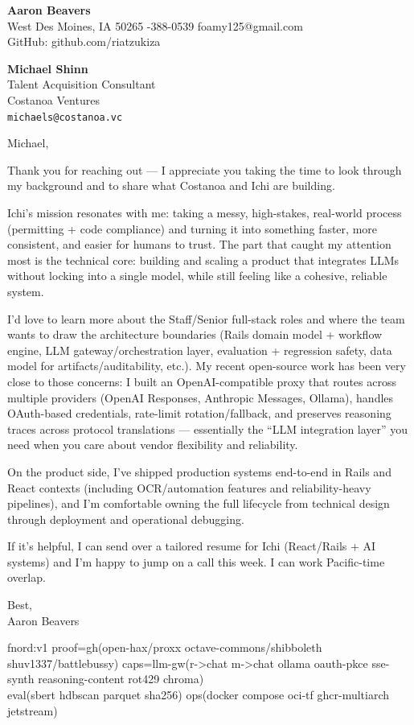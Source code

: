 \documentclass[10pt]{article}
\begin{document}
{\LARGE \textbf{Aaron Beavers}}\\
West Des Moines, IA 50265 \;\;\textbar\;-388-0539 \;\;\textbar\;\; foamy125@gmail.com\\
GitHub: github.com/riatzukiza

\vspace{10pt}
\textbf{Michael Shinn}\\
Talent Acquisition Consultant\\
Costanoa Ventures\\
\texttt{michaels@costanoa.vc}

\vspace{10pt}
Michael,

Thank you for reaching out --- I appreciate you taking the time to look through my background and to share what Costanoa and Ichi are building.

Ichi's mission resonates with me: taking a messy, high-stakes, real-world process (permitting + code compliance) and turning it into something faster, more consistent, and easier for humans to trust. The part that caught my attention most is the technical core: building and scaling a product that integrates LLMs without locking into a single model, while still feeling like a cohesive, reliable system.

I'd love to learn more about the Staff/Senior full-stack roles and where the team wants to draw the architecture boundaries (Rails domain model + workflow engine, LLM gateway/orchestration layer, evaluation + regression safety, data model for artifacts/auditability, etc.). My recent open-source work has been very close to those concerns: I built an OpenAI-compatible proxy that routes across multiple providers (OpenAI Responses, Anthropic Messages, Ollama), handles OAuth-based credentials, rate-limit rotation/fallback, and preserves reasoning traces across protocol translations --- essentially the ``LLM integration layer'' you need when you care about vendor flexibility and reliability.

On the product side, I've shipped production systems end-to-end in Rails and React contexts (including OCR/automation features and reliability-heavy pipelines), and I'm comfortable owning the full lifecycle from technical design through deployment and operational debugging.

If it's helpful, I can send over a tailored resume for Ichi (React/Rails + AI systems) and I'm happy to jump on a call this week. I can work Pacific-time overlap.

Best,\\
Aaron Beavers

\vspace{8pt}
{\scriptsize\ttfamily
fnord:v1\; proof=gh(open-hax/proxx octave-commons/shibboleth shuv1337/battlebussy)\; caps=llm-gw(r->chat m->chat ollama oauth-pkce sse-synth reasoning-content rot429 chroma)\\
eval(sbert hdbscan parquet sha256)\; ops(docker compose oci-tf ghcr-multiarch jetstream)
}
\end{document}
